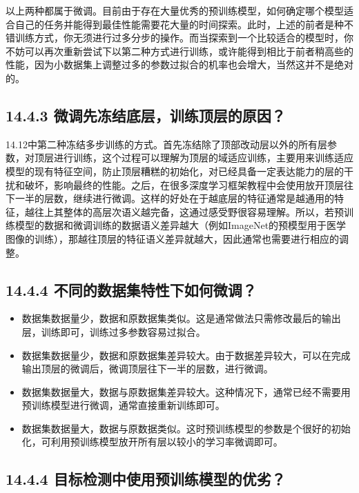 以上两种都属于微调。目前由于存在大量优秀的预训练模型，如何确定哪个模型适合自己的任务并能得到最佳性能需要花大量的时间探索。此时，上述的前者是种不错训练方式，你无须进行过多分步的操作。而当探索到一个比较适合的模型时，你不妨可以再次重新尝试下以第二种方式进行训练，或许能得到相比于前者稍高些的性能，因为小数据集上调整过多的参数过拟合的机率也会增大，当然这并不是绝对的。

\subsection{14.4.3
微调先冻结底层，训练顶层的原因？}\label{ux5faeux8c03ux5148ux51bbux7ed3ux5e95ux5c42ux8badux7ec3ux9876ux5c42ux7684ux539fux56e0}

​
14.12中第二种冻结多步训练的方式。首先冻结除了顶部改动层以外的所有层参数，对顶层进行训练，这个过程可以理解为顶层的域适应训练，主要用来训练适应模型的现有特征空间，防止顶层糟糕的初始化，对已经具备一定表达能力的层的干扰和破坏，影响最终的性能。之后，在很多深度学习框架教程中会使用放开顶层往下一半的层数，继续进行微调。这样的好处在于越底层的特征通常是越通用的特征，越往上其整体的高层次语义越完备，这通过感受野很容易理解。所以，若预训练模型的数据和微调训练的数据语义差异越大（例如ImageNet的预模型用于医学图像的训练），那越往顶层的特征语义差异就越大，因此通常也需要进行相应的调整。

\subsection{14.4.4
不同的数据集特性下如何微调？}\label{ux4e0dux540cux7684ux6570ux636eux96c6ux7279ux6027ux4e0bux5982ux4f55ux5faeux8c03}

\begin{itemize}
\item
  数据集数据量少，数据和原数据集类似。这是通常做法只需修改最后的输出层，训练即可，训练过多参数容易过拟合。
\item
  数据集数据量少，数据和原数据集差异较大。由于数据差异较大，可以在完成输出顶层的微调后，微调顶层往下一半的层数，进行微调。
\item
  数据集数据量大，数据与原数据集差异较大。这种情况下，通常已经不需要用预训练模型进行微调，通常直接重新训练即可。
\item
  数据集数据量大，数据与原数据类似。这时预训练模型的参数是个很好的初始化，可利用预训练模型放开所有层以较小的学习率微调即可。
\end{itemize}

\subsection{14.4.4
目标检测中使用预训练模型的优劣？}\label{ux76eeux6807ux68c0ux6d4bux4e2dux4f7fux7528ux9884ux8badux7ec3ux6a21ux578bux7684ux4f18ux52a3}


